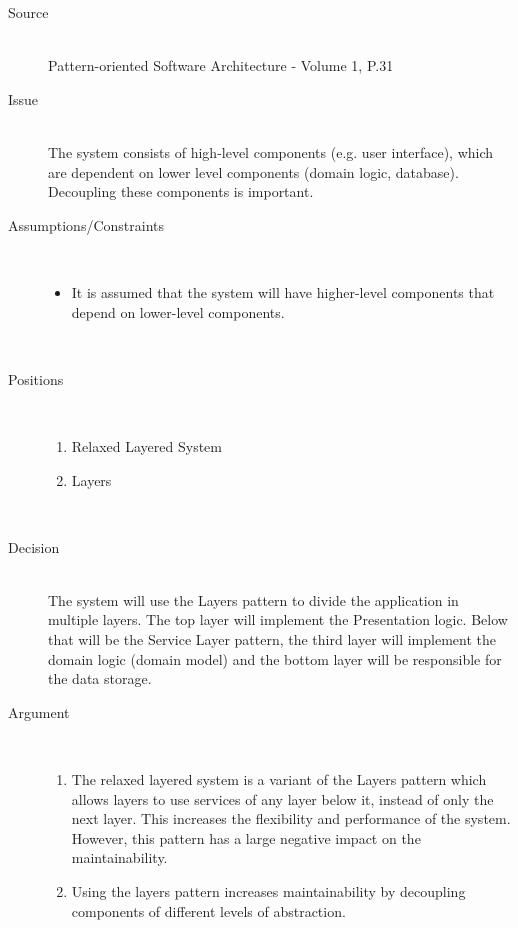 \begin{description}
\item [Source]~\\
Pattern-oriented Software Architecture - Volume 1, P.31 \cite{wiley-1}

\item [Issue]~\\
The system consists of high-level components (e.g. user interface), which are dependent on lower level components (domain logic, database). Decoupling these components is important.

\item [Assumptions/Constraints]~
\begin{itemize}
\item It is assumed that the system will have higher-level components that depend on lower-level components.
\end{itemize}
~\\[-1.5cm]

\item [Positions]~
\begin{enumerate}
\item Relaxed Layered System
\item Layers
\end{enumerate}
~\\[-1.5cm]

\item [Decision] ~\\
The system will use the Layers pattern to divide the application in multiple layers. The top layer will implement the Presentation logic. Below that will be the Service Layer pattern, the third layer will implement the domain logic (domain model) and the bottom layer will be responsible for the data storage.

\item [Argument]~
\begin{enumerate}
\item The relaxed layered system is a variant of the Layers pattern which allows layers to use services of any layer below it, instead of only the next layer. This increases the flexibility and performance of the system. However, this pattern has a large negative impact on the maintainability.

\item 
Using the layers pattern increases maintainability by decoupling components of different levels of abstraction.

\end{enumerate}


\end{description}
